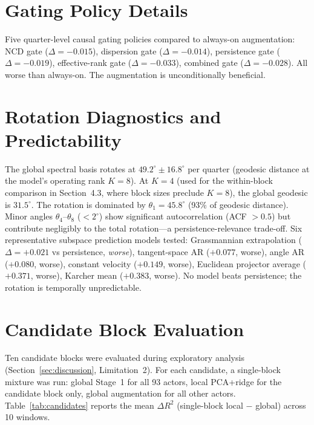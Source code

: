\documentclass[11pt,a4paper]{article}
\begin{document}
\section{Gating Policy Details}
\label{app:gating}

Five quarter-level causal gating policies compared to always-on augmentation: NCD gate ($\Delta = -0.015$), dispersion gate ($\Delta = -0.014$), persistence gate ($\Delta = -0.019$), effective-rank gate ($\Delta = -0.033$), combined gate ($\Delta = -0.028$). All worse than always-on. The augmentation is unconditionally beneficial.

\section{Rotation Diagnostics and Predictability}
\label{app:rotation}

The global spectral basis rotates at $49.2^\circ \pm 16.8^\circ$ per quarter (geodesic distance at the model's operating rank $K = 8$). At $K = 4$ (used for the within-block comparison in Section~4.3, where block sizes preclude $K = 8$), the global geodesic is $31.5^\circ$. The rotation is dominated by $\theta_1 = 45.8^\circ$ (93\% of geodesic distance). Minor angles $\theta_4$--$\theta_8$ ($< 2^\circ$) show significant autocorrelation (ACF $> 0.5$) but contribute negligibly to the total rotation---a persistence-relevance trade-off. Six representative subspace prediction models tested: Grassmannian extrapolation ($\Delta = +0.021$ vs persistence, \emph{worse}), tangent-space AR ($+0.077$, worse), angle AR ($+0.080$, worse), constant velocity ($+0.149$, worse), Euclidean projector average ($+0.371$, worse), Karcher mean ($+0.383$, worse). No model beats persistence; the rotation is temporally unpredictable.


\section{Candidate Block Evaluation}
\label{app:candidates}

Ten candidate blocks were evaluated during exploratory analysis (Section~\ref{sec:discussion}, Limitation~2). For each candidate, a single-block mixture was run: global Stage~1 for all 93 actors, local PCA+ridge for the candidate block only, global augmentation for all other actors. Table~\ref{tab:candidates} reports the mean $\Delta R^2$ (single-block local $-$ global) across 10 windows.
\end{document}
